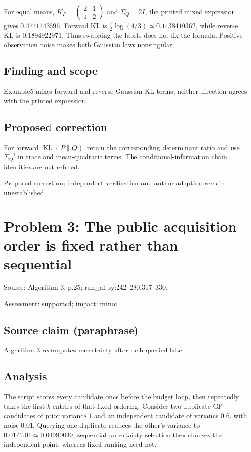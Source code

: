 \documentclass[11pt]{article}
\begin{document}
For equal means, \(K_P=\begin{pmatrix}2&1\\1&2\end{pmatrix}\) and \(\Sigma_Q=2I\), the printed mixed expression gives \(0.4771743696\). Forward KL is \(\frac12\log(4/3)\simeq0.1438410362\), while reverse KL is \(0.1894922971\). Thus swapping the labels does not fix the formula. Positive observation noise makes both Gaussian laws nonsingular.

\subsection*{Finding and scope}

Example5 mixes forward and reverse Gaussian-KL terms; neither direction agrees with the printed expression.

\subsection*{Proposed correction}

For forward \(\operatorname{KL}(P\|Q)\), retain the corresponding determinant ratio and use \(\Sigma_Q^{-1}\) in trace and mean-quadratic terms. The conditional-information chain identities are not refuted.

Proposed correction; independent verification and author adoption remain unestablished.

\section*{Problem 3: The public acquisition order is fixed rather than sequential}

Source: Algorithm 3, p.25; run\_al.py:242–280,317–330.

Assessment: supported; impact: minor

\subsection*{Source claim (paraphrase)}

Algorithm 3 recomputes uncertainty after each queried label.

\subsection*{Analysis}

The script scores every candidate once before the budget loop, then repeatedly takes the first \(k\) entries of that fixed ordering. Consider two duplicate GP candidates of prior variance \(1\) and an independent candidate of variance \(0.6\), with noise \(0.01\). Querying one duplicate reduces the other's variance to \(0.01/1.01\simeq0.00990099\); sequential uncertainty selection then chooses the independent point, whereas fixed ranking need not.
\end{document}

